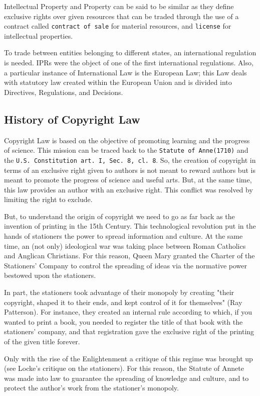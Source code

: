 Intellectual Property and Property can be said to be similar as they define exclusive rights over given resources that can be traded through the use of a contract called \texttt{contract of sale} for material resources, and \texttt{license} for intellectual properties.

To trade between entities belonging to different states, an international regulation is needed. IPRs were the object of one of the first international regulations. Also, a particular instance of International Law is the European Law; this Law deals with statutory law created within the
European Union and is divided into Directives, Regulations, and Decisions.

\subsection*{History of Copyright Law}

Copyright Law is based on the objective of promoting learning and the progress of science. This mission can be traced back to the \texttt{Statute of Anne(1710)} and the \texttt{U.S. Constitution art. I, Sec. 8, cl. 8}. So, the creation of copyright in terms of an exclusive right given to authors is not meant to reward authors but is meant to promote the progress of science and useful arts. But, at the same time, this law provides an author with an exclusive right. This conflict was resolved by limiting the right to exclude.

But, to understand the origin of copyright we need to go as far back as the invention of printing in the 15th Century. This technological revolution put in the hands of stationers the power to spread information and culture. At the same time, an (not only) ideological war was taking place between Roman Catholics and Anglican Christians. For this reason, Queen Mary granted the Charter of the Stationers' Company to control the spreading of ideas via the normative power bestowed upon the stationers.

In part, the stationers took advantage of their monopoly by creating "their copyright, shaped it to their ends, and kept control of it for themselves" (Ray Patterson). For instance, they created an internal rule according to which, if you wanted to print a book, you needed to register the title of that book with the stationers' company, and that registration gave the exclusive right of the printing of the given title forever.

Only with the rise of the Enlightenment a critique of this regime was brought up (see Locke's critique on the stationers). For this reason, the Statute of Annete was made into law to guarantee the spreading of knowledge and culture, and to protect the author's work from the stationer's monopoly.

